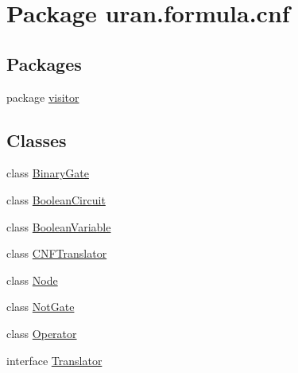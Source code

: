 \hypertarget{namespaceuran_1_1formula_1_1cnf}{}\section{Package uran.\+formula.\+cnf}
\label{namespaceuran_1_1formula_1_1cnf}
\subsection*{Packages}
\begin{DoxyCompactItemize}
\item 
package \hyperlink{namespaceuran_1_1formula_1_1cnf_1_1visitor}{visitor}
\end{DoxyCompactItemize}
\subsection*{Classes}
\begin{DoxyCompactItemize}
\item 
class \hyperlink{classuran_1_1formula_1_1cnf_1_1_binary_gate}{Binary\+Gate}
\item 
class \hyperlink{classuran_1_1formula_1_1cnf_1_1_boolean_circuit}{Boolean\+Circuit}
\item 
class \hyperlink{classuran_1_1formula_1_1cnf_1_1_boolean_variable}{Boolean\+Variable}
\item 
class \hyperlink{classuran_1_1formula_1_1cnf_1_1_c_n_f_translator}{C\+N\+F\+Translator}
\item 
class \hyperlink{classuran_1_1formula_1_1cnf_1_1_node}{Node}
\item 
class \hyperlink{classuran_1_1formula_1_1cnf_1_1_not_gate}{Not\+Gate}
\item 
class \hyperlink{classuran_1_1formula_1_1cnf_1_1_operator}{Operator}
\item 
interface \hyperlink{interfaceuran_1_1formula_1_1cnf_1_1_translator}{Translator}
\end{DoxyCompactItemize}
